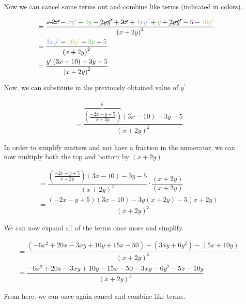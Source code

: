 Now we can cancel some terms out and combine like terms (indicated in colors).

\begin{align}
    &= \dfrac{\cancel{-2x} - \textcolor{blue}{xy^\prime} - \textcolor{darkgreen}{4y} - \cancel{2yy^\prime} + \cancel{2x} + \textcolor{blue}{4xy^\prime} + \textcolor{darkgreen}{y} + \cancel{2yy^\prime} - \textcolor{Plum}{5} - \textcolor{yellow!80!black}{10y^\prime}}{\left( x + 2y \right)^2} \\
    &= \dfrac{\textcolor{blue}{3xy^\prime} - \textcolor{yellow!80!black}{10y^\prime} - \textcolor{darkgreen}{3y} - \textcolor{Plum}{5}}{\left( x + 2y \right)^2} \\
    &= \dfrac{y^\prime \left( 3x - 10 \right) - 3y - 5}{\left( x + 2y \right)^2} \\
\end{align}

Now, we can substitute in the previously obtained value of \( y^\prime \)

\begin{align}
    &= \dfrac{\overbrace{\left( \frac{-2x - y + 5}{x + 2y} \right)}^{y^\prime} \left( 3x - 10 \right) - 3y - 5}{\left( x + 2y \right)^2}
\end{align}

In order to simplify matters and not have a fraction in the numerator, we can now multiply both the top and bottom by \( \left( x + 2y \right) \).

\begin{align}
    &= \dfrac{\left( \frac{-2x - y + 5}{x + 2y} \right) \left( 3x - 10 \right) - 3y - 5}{\left( x + 2y \right)^2} \cdot \dfrac{\left( x + 2y \right)}{\left( x + 2y \right)} \\
    &= \dfrac{\left( -2x - y + 5 \right) \left( 3x - 10 \right) - 3y \left( x + 2y \right) - 5 \left( x + 2y \right)}{\left( x + 2y \right)^3}
\end{align}

We can now expand all of the terms once more and simplify.

\begin{align}
    &= \dfrac{\left( -6x^2 + 20x - 3xy + 10y + 15x - 50 \right) - \left( 3xy + 6y^2 \right) - \left( 5x + 10y \right)}{\left( x + 2y \right)^3} \\
    &= \dfrac{-6x^2 + 20x - 3xy + 10y + 15x - 50 - 3xy - 6y^2 - 5x - 10y}{\left( x + 2y \right)^3}
\end{align}

From here, we can once again cancel and combine like terms.

